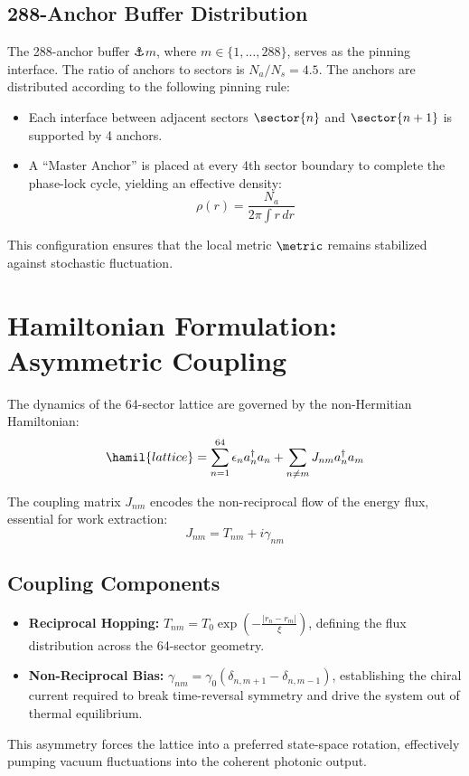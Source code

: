 \documentclass[12pt]{article}
\begin{document}
\subsection{288-Anchor Buffer Distribution}
The 288-anchor buffer $\anchor{m}$, where $m \in \{1, \dots, 288\}$, serves as the pinning interface. The ratio of anchors to sectors is $N_a / N_s = 4.5$. The anchors are distributed according to the following pinning rule:
\begin{itemize}
    \item Each interface between adjacent sectors $\sector{n}$ and $\sector{n+1}$ is supported by 4 anchors.
    \item A ``Master Anchor'' is placed at every 4th sector boundary to complete the phase-lock cycle, yielding an effective density:
    \begin{equation}
        \rho(r) = \frac{N_a}{2\pi \int r \, dr}
    \end{equation}
\end{itemize}
This configuration ensures that the local metric $\metric$ remains stabilized against stochastic fluctuation.
\section{Hamiltonian Formulation: Asymmetric Coupling}

The dynamics of the 64-sector lattice are governed by the non-Hermitian Hamiltonian:
\begin{equation}
    \hamil{lattice} = \sum_{n=1}^{64} \epsilon_n a_n^\dagger a_n + \sum_{n \neq m} J_{nm} a_n^\dagger a_m
\end{equation}

The coupling matrix $J_{nm}$ encodes the non-reciprocal flow of the energy flux, essential for work extraction:
\begin{equation}
    J_{nm} = T_{nm} + i\gamma_{nm}
\end{equation}

\subsection{Coupling Components}
\begin{itemize}
    \item \textbf{Reciprocal Hopping:} $T_{nm} = T_0 \exp\left( -\frac{|r_n - r_m|}{\xi} \right)$, defining the flux distribution across the 64-sector geometry.
    \item \textbf{Non-Reciprocal Bias:} $\gamma_{nm} = \gamma_0 \left( \delta_{n, m+1} - \delta_{n, m-1} \right)$, establishing the chiral current required to break time-reversal symmetry and drive the system out of thermal equilibrium.
\end{itemize}
This asymmetry forces the lattice into a preferred state-space rotation, effectively pumping vacuum fluctuations into the coherent photonic output.
\end{document}
